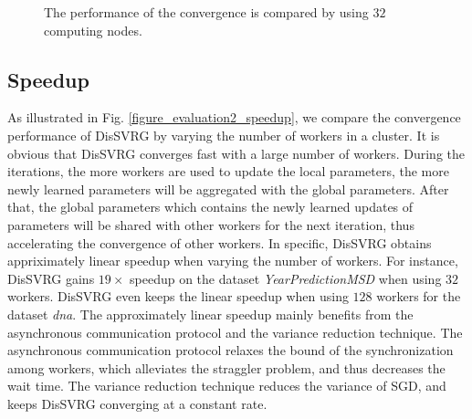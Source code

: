 \documentclass[preprint,review,11pt,a4paper]{elsarticle}
\begin{document}
\begin{figure}
\centering
{}
\caption{The performance of the convergence is compared by using $32$ computing nodes.}
\label{figure_evaluation1_convergence}
\end{figure}

\subsection{Speedup}
As illustrated in Fig. \ref{figure_evaluation2_speedup}, we compare the convergence performance of DisSVRG by varying the number of workers in a cluster. It is obvious that DisSVRG converges fast with a large number of workers. During the iterations, the more workers are used to update the local parameters, the more newly learned parameters will be aggregated with the global parameters. After that, the global parameters which contains the newly learned updates of parameters will be shared with other workers for the next iteration, thus accelerating the convergence of other workers. In specific, DisSVRG obtains appriximately linear speedup when varying the number of workers. For instance, DisSVRG gains $19\times$ speedup on the dataset \emph{YearPredictionMSD} when using $32$ workers. DisSVRG even keeps the linear speedup when using $128$ workers for the dataset \emph{dna}. The approximately linear speedup mainly benefits from the asynchronous communication protocol and the variance reduction technique. The asynchronous communication protocol relaxes the bound of the synchronization among workers, which alleviates the straggler problem, and thus decreases the wait time. The variance reduction technique reduces the variance of SGD, and keeps DisSVRG converging at a constant rate.
\end{document}
